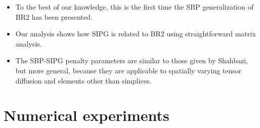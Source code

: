 \documentclass{beamer}
\begin{document}
\begin{frame}
    \begin{itemize}
        \item To the best of our knowledge, this is the first time the SBP generalization of BR2 has been presented.
        \item Our analysis shows how SIPG is related to BR2 using straightforward matrix analysis.
        \item The SBP-SIPG penalty parameters are similar to those given by Shahbazi\cite{Shahbazi2005explicit}, but more general, because they are applicable to spatially varying tensor diffusion and elements other than simplices.
    \end{itemize}
\end{frame}


\section{Numerical experiments}
\end{document}
